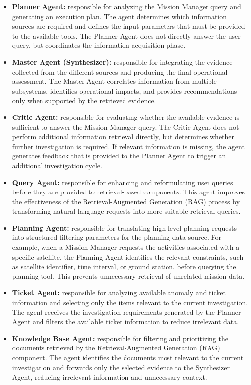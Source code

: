 \begin{itemize}
    \item \textbf{Planner Agent:} responsible for analyzing the Mission Manager query and generating an execution plan. The agent determines which information sources are required and defines the input parameters that must be provided to the available tools. The Planner Agent does not directly answer the user query, but coordinates the information acquisition phase.
    
    \item \textbf{Master Agent (Synthesizer):} responsible for integrating the evidence collected from the different sources and producing the final operational assessment. The Master Agent correlates information from multiple subsystems, identifies operational impacts, and provides recommendations only when supported by the retrieved evidence.

    \item \textbf{Critic Agent:} responsible for evaluating whether the available evidence is sufficient to answer the Mission Manager query. The Critic Agent does not perform additional information retrieval directly, but determines whether further investigation is required. If relevant information is missing, the agent generates feedback that is provided to the Planner Agent to trigger an additional investigation cycle.

    \item \textbf{Query Agent:} responsible for enhancing and reformulating user queries before they are provided to retrieval-based components. This agent improves the effectiveness of the Retrieval-Augmented Generation (RAG) process by transforming natural language requests into more suitable retrieval queries.

    \item \textbf{Planning Agent:} responsible for translating high-level planning requests into structured filtering parameters for the planning data source. For example, when a Mission Manager requests the activities associated with a specific satellite, the Planning Agent identifies the relevant constraints, such as satellite identifier, time interval, or ground station, before querying the planning tool. This prevents unnecessary retrieval of unrelated mission data.

    \item \textbf{Ticket Agent:} responsible for analyzing available anomaly and ticket information and selecting only the items relevant to the current investigation. The agent receives the investigation requirements generated by the Planner Agent and filters the available ticket information to reduce irrelevant data.

    \item \textbf{Knowledge Base Agent:} responsible for filtering and prioritizing the documents retrieved by the Retrieval-Augmented Generation (RAG) component. The agent identifies the documents most relevant to the current investigation and forwards only the selected evidence to the Synthesizer Agent, reducing irrelevant information and unnecessary context.


\end{itemize}

